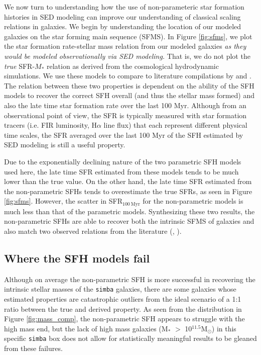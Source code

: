 \documentclass[twocolumn]{aastex62}
\begin{document}
We now turn to understanding how the use of non-parameteric star formation histories in SED modeling can improve our understanding of classical scaling relations in galaxies.  We begin by understanding the location of our modeled galaxies on the star forming main sequence (SFMS).  In Figure \ref{fig:sfms}, we plot the star formation rate-stellar mass relation from our modeled galaxies {\it as they would be modeled observationally via SED modeling.}  That is, we do not plot the {\it true} SFR-$M_*$ relation as derived from the cosmological hydrodynamic simulations.  We use these models to compare to literature compilations by \citet{schreiber_herschel_2015} and \citet{boogaard_muse_2018}. The relation between these two properties is dependent on the ability of the SFH models to recover the correct SFH overall (and thus the stellar mass formed) and also the late time star formation rate over the last 100 Myr. Although from an observational point of view, the SFR is typically measured with star formation tracers (i.e. FIR luminosity, H$\alpha$ line flux) that each represent different physical time scales, the SFR averaged over the last 100 Myr of the SFH estimated by SED modeling is still a useful property. 

Due to the exponentially declining nature of the two parametric SFH models used here, the late time SFR estimated from these models tends to be much lower than the true value. On the other hand, the late time SFR estimated from the non-parametric SFHs tends to overestimate the true SFRs, as seen in Figure \ref{fig:sfms}. However, the scatter in SFR$_{100 \: \mathrm{Myr}}$ for the non-parametric models is much less than that of the parametric models. Synthesizing these two results, the non-parametric SFHs are able to recover both the intrinsic SFMS of galaxies and also match two observed relations from the literature (\cite{boogaard_muse_2018}, \cite{schreiber_herschel_2015}). 

\subsection{Where the SFH models fail}\label{section:fail}


Although on average the non-parametric SFH is more successful in recovering the intrinsic stellar masses of the \texttt{simba} galaxies, there are some galaxies whose estimated properties are catastrophic outliers from the ideal scenario of a 1:1 ratio between the true and derived property. As seen from the distribution in Figure \ref{fig:mass_comp}, the non-parametric SFH appears to struggle with the high mass end, but the lack of high mass galaxies (M$_*$ $>$ 10$^{11.5} \mathrm{M}_{\odot}$) in this specific \texttt{simba} box does not allow for statistically meaningful results to be gleaned from these failures. 
\end{document}
